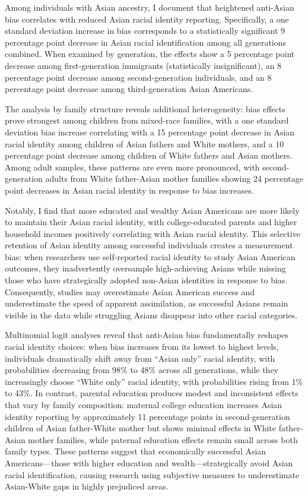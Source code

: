 Among individuals with Asian ancestry, I document that heightened anti-Asian bias correlates with reduced Asian racial identity reporting. Specifically, a one standard deviation increase in bias corresponds to a statistically significant 9 percentage point decrease in Asian racial identification among all generations combined. When examined by generation, the effects show a 5 percentage point decrease among first-generation immigrants (statistically insignificant), an 8 percentage point decrease among second-generation individuals, and an 8 percentage point decrease among third-generation Asian Americans. 

The analysis by family structure reveals additional heterogeneity: bias effects prove strongest among children from mixed-race families, with a one standard deviation bias increase correlating with a 15 percentage point decrease in Asian racial identity among children of Asian fathers and White mothers, and a 10 percentage point decrease among children of White fathers and Asian mothers. Among adult samples, these patterns are even more pronounced, with second-generation adults from White father-Asian mother families showing 24 percentage point decreases in Asian racial identity in response to bias increases.

Notably, I find that more educated and wealthy Asian Americans are more likely to maintain their Asian racial identity, with college-educated parents and higher household incomes positively correlating with Asian racial identity. This selective retention of Asian identity among successful individuals creates a measurement bias: when researchers use self-reported racial identity to study Asian American outcomes, they inadvertently oversample high-achieving Asians while missing those who have strategically adopted non-Asian identities in response to bias. Consequently, studies may overestimate Asian American success and underestimate the speed of apparent assimilation, as successful Asians remain visible in the data while struggling Asians disappear into other racial categories.

Multinomial logit analyses reveal that anti-Asian bias fundamentally reshapes racial identity choices: when bias increases from its lowest to highest levels, individuals dramatically shift away from ``Asian only'' racial identity, with probabilities decreasing from 98\% to 48\% across all generations, while they increasingly choose ``White only'' racial identity, with probabilities rising from 1\% to 43\%. In contrast, parental education produces modest and inconsistent effects that vary by family composition: maternal college education increases Asian identity reporting by approximately 11 percentage points in second-generation children of Asian father-White mother but shows minimal effects in White father-Asian mother families, while paternal education effects remain small across both family types. These patterns suggest that economically successful Asian Americans---those with higher education and wealth---strategically avoid Asian racial identification, causing research using subjective measures to underestimate Asian-White gaps in highly prejudiced areas.

